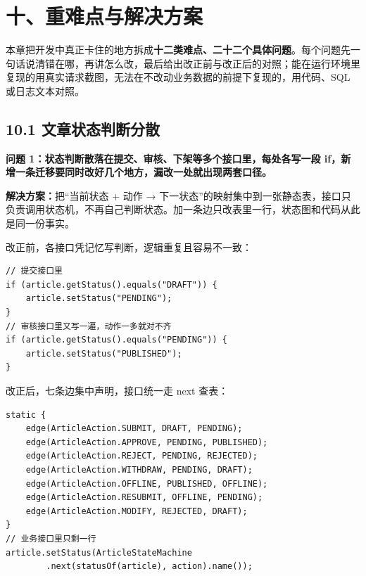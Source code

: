\documentclass[zihao=-4,UTF8,openany]{ctexart}
\renewcommand{\_}{\textunderscore\allowbreak}
\begin{document}
\section*{\texorpdfstring{\textbf{十、重难点与解决方案}}{十、重难点与解决方案}}\label{ux516bux91cdux96beux70b9ux4e0eux89e3ux51b3ux65b9ux6848}

本章把开发中真正卡住的地方拆成\textbf{十二类难点、二十二个具体问题}。每个问题先一句话说清错在哪，再讲怎么改，最后给出改正前与改正后的对照；能在运行环境里复现的用真实请求截图，无法在不改动业务数据的前提下复现的，用代码、SQL 或日志文本对照。

\subsection*{\texorpdfstring{\textbf{10.1 文章状态判断分散}}{10.1 文章状态判断分散}}\label{ux72b6ux6001ux673aux5224ux6563}

\noindent\textbf{问题 1：状态判断散落在提交、审核、下架等多个接口里，每处各写一段 if，新增一条迁移要同时改好几个地方，漏改一处就出现两套口径。}

\textbf{解决方案：}把“当前状态 + 动作 → 下一状态”的映射集中到一张静态表，接口只负责调用状态机，不再自己判断状态。加一条边只改表里一行，状态图和代码从此是同一份事实。

改正前，各接口凭记忆写判断，逻辑重复且容易不一致：

\begin{lstlisting}
// 提交接口里
if (article.getStatus().equals("DRAFT")) {
    article.setStatus("PENDING");
}
// 审核接口里又写一遍，动作一多就对不齐
if (article.getStatus().equals("PENDING")) {
    article.setStatus("PUBLISHED");
}
\end{lstlisting}

改正后，七条边集中声明，接口统一走 next 查表：

\begin{lstlisting}
static {
    edge(ArticleAction.SUBMIT, DRAFT, PENDING);
    edge(ArticleAction.APPROVE, PENDING, PUBLISHED);
    edge(ArticleAction.REJECT, PENDING, REJECTED);
    edge(ArticleAction.WITHDRAW, PENDING, DRAFT);
    edge(ArticleAction.OFFLINE, PUBLISHED, OFFLINE);
    edge(ArticleAction.RESUBMIT, OFFLINE, PENDING);
    edge(ArticleAction.MODIFY, REJECTED, DRAFT);
}
// 业务接口里只剩一行
article.setStatus(ArticleStateMachine
        .next(statusOf(article), action).name());
\end{lstlisting}
\end{document}
